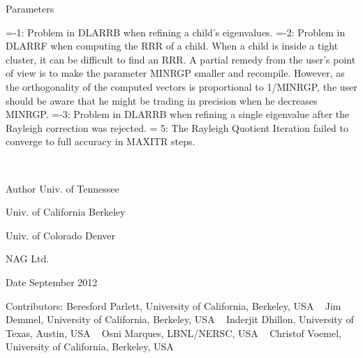 \begin{DoxyParams}[1]{Parameters}
\begin{DoxyVerb}
          =-1:  Problem in DLARRB when refining a child's eigenvalues.
          =-2:  Problem in DLARRF when computing the RRR of a child.
                When a child is inside a tight cluster, it can be difficult
                to find an RRR. A partial remedy from the user's point of
                view is to make the parameter MINRGP smaller and recompile.
                However, as the orthogonality of the computed vectors is
                proportional to 1/MINRGP, the user should be aware that
                he might be trading in precision when he decreases MINRGP.
          =-3:  Problem in DLARRB when refining a single eigenvalue
                after the Rayleigh correction was rejected.
          = 5:  The Rayleigh Quotient Iteration failed to converge to
                full accuracy in MAXITR steps.\end{DoxyVerb}
 \\
\hline
\end{DoxyParams}
\begin{DoxyAuthor}{Author}
Univ. of Tennessee 

Univ. of California Berkeley 

Univ. of Colorado Denver 

N\+A\+G Ltd. 
\end{DoxyAuthor}
\begin{DoxyDate}{Date}
September 2012 
\end{DoxyDate}
\begin{DoxyParagraph}{Contributors\+: }
Beresford Parlett, University of California, Berkeley, U\+S\+A ~\newline
 Jim Demmel, University of California, Berkeley, U\+S\+A ~\newline
 Inderjit Dhillon, University of Texas, Austin, U\+S\+A ~\newline
 Osni Marques, L\+B\+N\+L/\+N\+E\+R\+S\+C, U\+S\+A ~\newline
 Christof Voemel, University of California, Berkeley, U\+S\+A 
\end{DoxyParagraph}

